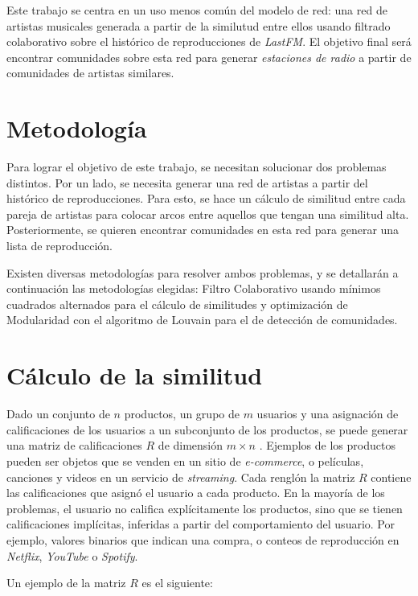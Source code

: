 \documentclass[conference]{IEEEtran}
\begin{document}
Este trabajo se centra en un uso menos común del modelo de red: una red de artistas musicales generada a partir de la similutud entre ellos usando filtrado colaborativo sobre el histórico de reproducciones de \textit{LastFM}. El objetivo final será encontrar comunidades sobre esta red para generar \textit{estaciones de radio} a partir de comunidades de artistas similares.

\section{Metodología}

Para lograr el objetivo de este trabajo, se necesitan solucionar dos problemas distintos. Por un lado, se necesita generar una red de artistas a partir del histórico de reproducciones. Para esto, se hace un cálculo de similitud entre cada pareja de artistas para colocar arcos entre aquellos que tengan una similitud alta. Posteriormente, se quieren encontrar comunidades en esta red para generar una lista de reproducción.

Existen diversas metodologías para resolver ambos problemas, y se detallarán a continuación las metodologías elegidas: Filtro Colaborativo usando mínimos cuadrados alternados para el cálculo de similitudes y optimización de Modularidad con el algoritmo de Louvain para el de detección de comunidades.

\section{Cálculo de la similitud}

Dado un conjunto de $n$ productos, un grupo de $m$ usuarios y una asignación de calificaciones de los usuarios a un subconjunto de los productos, se puede generar una matriz de calificaciones $R$ de dimensión $m \times n$ . Ejemplos de los productos pueden ser objetos que se venden en un sitio de \textit{e-commerce}, o películas, canciones y videos en un servicio de \textit{streaming}. Cada renglón la matriz $R$ contiene las calificaciones que asignó el usuario a cada producto. En la mayoría de los problemas, el usuario no califica explícitamente los productos, sino que se tienen calificaciones implícitas, inferidas a partir del comportamiento del usuario. Por ejemplo, valores binarios que indican una compra, o conteos de reproducción en \textit{Netflix}, \textit{YouTube} o \textit{Spotify}.

Un ejemplo de la matriz $R$ es el siguiente:
\end{document}
